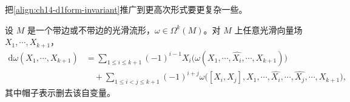 \documentclass[../../main.tex]{subfiles}
\begin{document}
把\eqref{align:ch14-d1form-invariant}推广到更高次形式要更复杂一些。

\begin{proposition}[外导数的不变式公式]\label{proposition:ch14-dk-invariant}
设 $M$ 是一个带边或不带边的光滑流形，$\omega\in\Omega^k(M)$。对 $M$ 上任意光滑向量场 $X_1,\cdots ,X_{k+1}$，
\begin{align}
\mathrm{d}\omega(X_1,\cdots ,X_{k+1})
&=\sum_{1\leqslant i\leqslant k+1}(-1)^{i-1}X_i\bigl(\omega(X_1,\cdots ,\widehat{X_i},\cdots ,X_{k+1})\bigr)\nonumber\\
&\quad+\sum_{1\leqslant i<j\leqslant k+1}(-1)^{i+j}\omega\bigl([X_i,X_j],X_1,\cdots ,\widehat{X_i},\cdots ,\widehat{X_j},\cdots ,X_{k+1}\bigr),\label{align:ch14-dk-invariant}
\end{align}
其中帽子表示删去该自变量。
\end{proposition}
\end{document}
